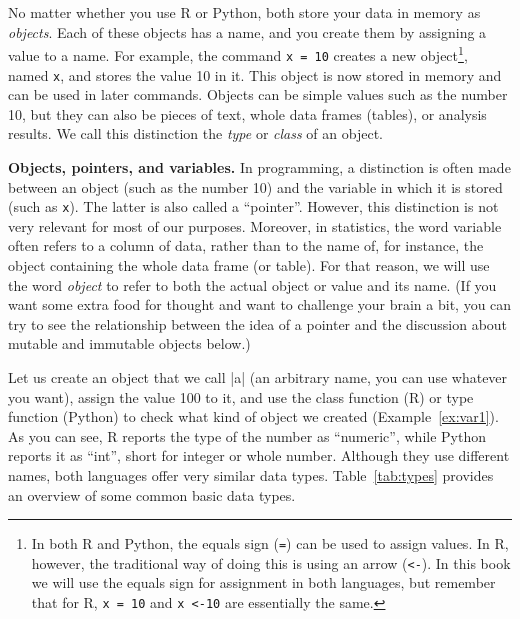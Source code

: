 No matter whether you use R or Python, both store your data in memory as \emph{objects}.
Each of these objects has a name, and you create them by
assigning a value to a name. For example, the command \texttt{x = 10}
creates a new object\footnote{In both R and Python, the equals
  sign (\texttt{=}) can be used to assign values. In R, however, the
  traditional way of doing this is using an arrow (\texttt{\textless-}). In
  this book we will use the equals sign for assignment in both
  languages, but remember that for R, \texttt{x = 10} and
  \texttt{x \textless-10} are essentially the same.}, named \texttt{x}, and stores the value 10
in it.  This object is now stored in memory and can be used in later
commands. Objects can be simple values such as the number 10, but they can also
be pieces of text, whole data frames (tables), or analysis results.
We call this distinction the \emph{type} or \emph{class} of an
object. 

\begin{feature}
\textbf{Objects, pointers, and variables.} In programming, a distinction is
  often made between an object (such as the number 10) and the
  variable in which it is stored (such as \texttt{x}). The latter is also called a ``pointer''.
  However, this distinction is not very relevant for most of our
  purposes. Moreover, in statistics, the word variable often refers to a
  column of data, rather than to the name of, for instance, the object
  containing the whole data frame (or table).  For that
  reason, we will use the word \emph{object} to refer to both the
  actual object or value and its name. (If you want some extra food
  for thought and want to challenge your brain
  a bit, you can try to see the relationship between the idea of a pointer and
  the discussion about mutable and immutable objects below.)
\end{feature}

Let us create an object that we call |a| (an arbitrary name, you can use
whatever you want), assign the value 100 to it, and use the class
function (R) or type function (Python) to check what kind of
object we created (Example~\ref{ex:var1}).
As you can see, R reports the type of the number as ``numeric'', while Python reports it
as ``int'', short for integer or whole number.  Although they use
different names, both languages offer very similar data types.
Table~\ref{tab:types} provides an overview of some common basic data types.

